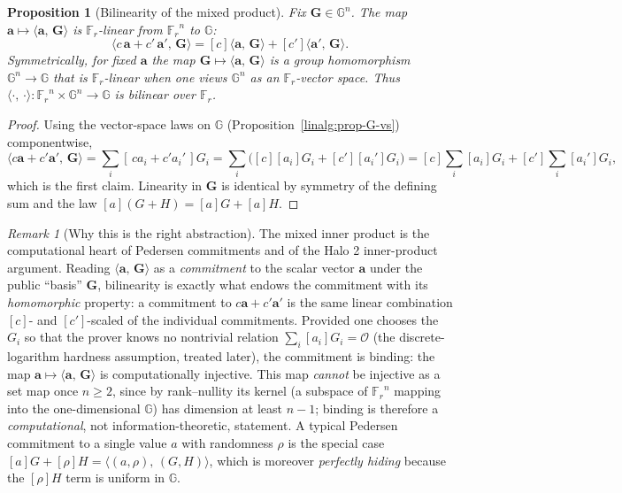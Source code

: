 \documentclass[11pt,a4paper]{article}
\newtheorem{proposition}[theorem]{Proposition}
\theoremstyle{definition}
\theoremstyle{remark}
\newtheorem{remark}[theorem]{Remark}
\newcommand{\G}{\ensuremath{\mathbb{G}}}
\newcommand{\ip}[2]{\langle #1,\, #2 \rangle}
\newcommand{\Fr}{\ensuremath{\mathbb{F}_{r}}}
\begin{document}
\begin{proposition}[Bilinearity of the mixed product]\label{linalg:prop-msm-bilinear}
Fix \(\mathbf G \in \G^n\). The map \(\mathbf a \mapsto \ip{\mathbf a}{\mathbf G}\) is \(\Fr\)-linear from \(\Fr^n\) to \(\G\):
\[
\ip{c\,\mathbf a + c'\,\mathbf a'}{\mathbf G} = [c]\ip{\mathbf a}{\mathbf G} + [c']\ip{\mathbf a'}{\mathbf G}.
\]
Symmetrically, for fixed \(\mathbf a\) the map \(\mathbf G \mapsto \ip{\mathbf a}{\mathbf G}\) is a group homomorphism \(\G^n \to \G\) that is \(\Fr\)-linear when one views \(\G^n\) as an \(\Fr\)-vector space. Thus \(\ip{\cdot}{\cdot} \colon \Fr^n \times \G^n \to \G\) is bilinear over \(\Fr\).
\end{proposition}

\begin{proof}
Using the vector-space laws on \(\G\) (Proposition~\ref{linalg:prop-G-vs}) componentwise,
\[
\ip{c\mathbf a + c'\mathbf a'}{\mathbf G} = \sum_i [\,c a_i + c' a_i'\,]G_i = \sum_i\big([c][a_i]G_i + [c'][a_i']G_i\big) = [c]\sum_i [a_i]G_i + [c']\sum_i [a_i']G_i,
\]
which is the first claim. Linearity in \(\mathbf G\) is identical by symmetry of the defining sum and the law \([a](G + H) = [a]G + [a]H\).
\end{proof}

\begin{remark}[Why this is the right abstraction]\label{linalg:rem-msm-meaning}
The mixed inner product is the computational heart of Pedersen commitments and of the Halo 2 inner-product argument. Reading \(\ip{\mathbf a}{\mathbf G}\) as a \emph{commitment} to the scalar vector \(\mathbf a\) under the public ``basis'' \(\mathbf G\), bilinearity is exactly what endows the commitment with its \emph{homomorphic} property: a commitment to \(c\mathbf a + c'\mathbf a'\) is the same linear combination \([c]\)- and \([c']\)-scaled of the individual commitments. Provided one chooses the \(G_i\) so that the prover knows no nontrivial relation \(\sum_i [a_i]G_i = \mathcal O\) (the discrete-logarithm hardness assumption, treated later), the commitment is binding: the map \(\mathbf a \mapsto \ip{\mathbf a}{\mathbf G}\) is computationally injective. This map \emph{cannot} be injective as a set map once \(n \ge 2\), since by rank--nullity its kernel (a subspace of \(\Fr^n\) mapping into the one-dimensional \(\G\)) has dimension at least \(n - 1\); binding is therefore a \emph{computational}, not information-theoretic, statement. A typical Pedersen commitment to a single value \(a\) with randomness \(\rho\) is the special case \([a]G + [\rho]H = \ip{(a,\rho)}{(G,H)}\), which is moreover \emph{perfectly hiding} because the \([\rho]H\) term is uniform in \(\G\).
\end{remark}
\end{document}

